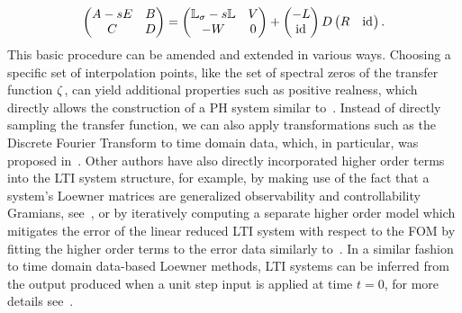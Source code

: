 \begin{equation}\label{eq:loewner-realization}
    \begin{pmatrix}
        A - sE & B \\
        C & D
    \end{pmatrix} = \begin{pmatrix}
        \mathbb{L}_\sigma - s \mathbb{L} & V \\
        -W & 0
    \end{pmatrix} + \begin{pmatrix}
        -L \\
        \text{id}_{}
    \end{pmatrix} D \begin{pmatrix}
        R & \text{id}_{}
    \end{pmatrix}.
\end{equation}
This basic procedure can be amended and extended in various ways.
Choosing a specific set of interpolation points, like the set of spectral zeros of the transfer function $\zeta$, can yield additional properties such as positive realness, which directly allows the construction of a \ac{PH} system similar to~\cite{BGD2020, Poussot2022}.
Instead of directly sampling the transfer function, we can also apply transformations such as the Discrete Fourier Transform to time domain data, which, in particular, was proposed in~\cite{Peherstorfer2017, Cherifi2021}.
Other authors have also directly incorporated higher order terms into the \ac{LTI} system structure, for example, by making use of the fact that a system's Loewner matrices are generalized observability and controllability Gramians, see~\cite{Antoulas2019}, or by iteratively computing a separate higher order model which mitigates the error of the linear reduced \ac{LTI} system with respect to the \ac{FOM} by fitting the higher order terms to the error data similarly to~\cite{GKA2021}.
In a similar fashion to time domain data-based Loewner methods, \ac{LTI} systems can be inferred from the output produced when a unit step input is applied at time $t = 0$, for more details see~\cite{Miller2012}.


